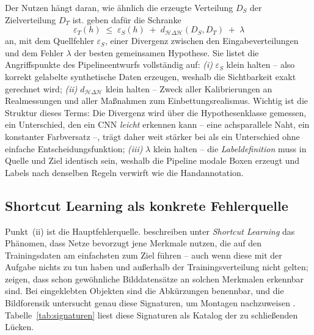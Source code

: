 Der Nutzen hängt daran,
wie ähnlich die erzeugte Verteilung $D_S$ der Zielverteilung $D_T$ ist.
\textcite{bendavid2010} geben dafür die Schranke
\begin{equation}
\varepsilon_T(h) \;\leq\; \varepsilon_S(h)
\;+\; d_{\mathcal{H}\Delta\mathcal{H}}(D_S, D_T) \;+\; \lambda
\label{eq:bendavid}
\end{equation}
an, mit dem Quellfehler $\varepsilon_S$, einer Divergenz zwischen den
Eingabeverteilungen und dem Fehler $\lambda$ der besten gemeinsamen Hypothese.
Sie listet die Angriffspunkte des Pipelineentwurfs vollständig auf:
\emph{(i)} $\varepsilon_S$ klein halten -- also korrekt gelabelte synthetische
Daten erzeugen, weshalb die Sichtbarkeit exakt gerechnet wird;
\emph{(ii)} $d_{\mathcal{H}\Delta\mathcal{H}}$ klein halten -- Zweck aller
Kalibrierungen an Realmessungen und aller Maßnahmen zum Einbettungsrealismus.
Wichtig ist die Struktur dieses Terms: Die Divergenz wird über die
Hypothesenklasse gemessen, ein Unterschied, den ein CNN \emph{leicht} erkennen
kann -- eine achsparallele Naht, ein konstanter Farbversatz --, trägt daher weit
stärker bei als ein Unterschied ohne einfache Entscheidungsfunktion;
\emph{(iii)} $\lambda$ klein halten -- die \emph{Labeldefinition} muss in Quelle
und Ziel identisch sein, weshalb die Pipeline modale Boxen erzeugt und Labels
nach denselben Regeln verwirft wie die Handannotation.

\subsection{Shortcut Learning als konkrete Fehlerquelle}
\label{sec:shortcut}

Punkt~(ii) ist die Hauptfehlerquelle. \textcite{geirhos2020} beschreiben unter
\emph{Shortcut Learning} das Phänomen, dass Netze bevorzugt jene Merkmale nutzen,
die auf den Trainingsdaten am einfachsten zum Ziel führen -- auch wenn diese mit
der Aufgabe nichts zu tun haben und außerhalb der Trainingsverteilung nicht
gelten; \textcite{torralba2011} zeigen, dass schon gewöhnliche Bilddatensätze an
solchen Merkmalen erkennbar sind. Bei eingeklebten Objekten sind die Abkürzungen
benennbar, und die Bildforensik untersucht genau diese Signaturen, um Montagen
nachzuweisen \parencite{farid2009}. Tabelle~\ref{tab:signaturen} liest diese
Signaturen als Katalog der zu schließenden Lücken.

